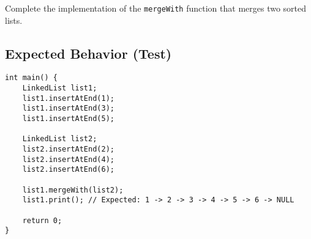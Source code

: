 \documentclass{article}
\begin{document}
Complete the implementation of the \texttt{mergeWith} function that merges two sorted lists.

\subsection*{Expected Behavior (Test)}

\begin{lstlisting}[style=cppstyle]
int main() {
    LinkedList list1;
    list1.insertAtEnd(1);
    list1.insertAtEnd(3);
    list1.insertAtEnd(5);

    LinkedList list2;
    list2.insertAtEnd(2);
    list2.insertAtEnd(4);
    list2.insertAtEnd(6);

    list1.mergeWith(list2);
    list1.print(); // Expected: 1 -> 2 -> 3 -> 4 -> 5 -> 6 -> NULL

    return 0;
}
\end{lstlisting}
\end{document}
